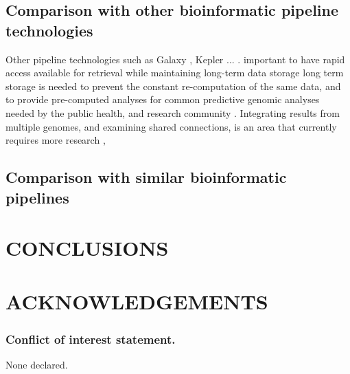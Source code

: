 \documentclass[a4,center,fleqn]{NAR}
\begin{document}
\subsection{Comparison with other bioinformatic pipeline technologies}

Other pipeline technologies such as Galaxy \cite{goecks2010galaxy}, Kepler ... \cite{de2015trends}.
important to have rapid access available for retrieval while maintaining long-term data storage \cite{schatz2015biological}
long term storage is needed to prevent the constant re-computation of the same data, and to provide pre-computed analyses for common predictive genomic analyses needed by the public health, and research community \cite{de2015trends}.
Integrating results from multiple genomes, and examining shared connections, is an area that currently requires more research \cite{fricke2014bacterial},

\subsection{Comparison with similar bioinformatic pipelines}




\section{CONCLUSIONS}

\section{ACKNOWLEDGEMENTS}


\subsubsection{Conflict of interest statement.} None declared.
\newpage
\end{document}
